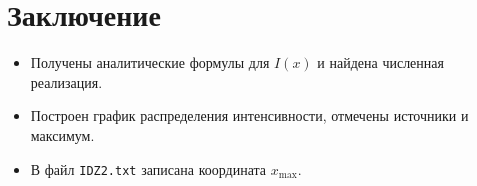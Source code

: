 \section{Заключение}
\begin{itemize}
  \item Получены аналитические формулы для $I(x)$ и найдена численная реализация.
  \item Построен график распределения интенсивности, отмечены источники и максимум.
  \item В файл \texttt{IDZ2.txt} записана координата $x_{\max}$.
\end{itemize}

